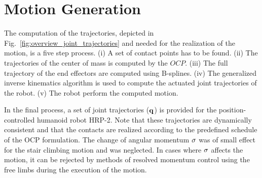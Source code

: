 \section{Motion Generation}
\label{sec:motion_generation}
%
%
The computation of the trajectories, depicted in Fig.~\ref{fig:overview_joint_trajectories} and needed for the realization of the motion, is a five step process.
(i) A set of contact points has to be found.
(ii) The trajectories of the center of mass is computed by the $OCP$.
(iii) The full trajectory of the end effectors are computed using B-splines.
(iv) The generalized inverse kinematics algorithm is used to compute the actuated joint trajectories of the robot.
(v) The robot perform the computed motion.



In the final process, a set of joint trajectories (${\bf q}$) is provided for the position-controlled humanoid robot HRP-2.
Note that these trajectories are dynamically consistent and that the contacts are realized according to the predefined schedule of the OCP formulation.
The change of angular momentum ${\bf \sigma}$ was of small effect for the stair climbing motion and was neglected.
In cases where ${\bf \sigma}$ affects the motion, it can be rejected by methods of resolved momentum control using the free limbs during the execution of the motion.

